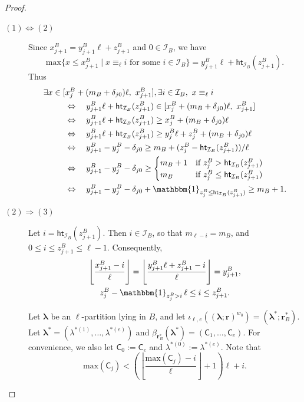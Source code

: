 \documentclass[11pt,a4paper,reqno]{amsart}
\numberwithin{equation}{section}
\theoremstyle{plain}
\theoremstyle{definition}
\theoremstyle{remark}
\numberwithin{equation}{section}
\newcommand{\bbone}{\mathbbm{1}}
\newcommand{\bl}{\boldsymbol{\lambda}}
\newcommand{\br}{\mathbf{r}}
\renewcommand{\max}{\mathrm{max}}
\newcommand{\C}{\mathsf{C}}
\newcommand{\Ht}{\mathsf{ht}}
\newcommand{\II}{\mathcal{I}}
\begin{document}
\begin{proof} \hfill
\begin{description}
\item[$(1) \Leftrightarrow (2)$]
Since $x^B_{j+1} = y^B_{j+1} \ell + z^B_{j+1}$ and $0 \in \II_B$, we have
$$
\max\{ x \leq x^B_{j+1} \mid x \equiv_{\ell} i \text{ for some } i \in \II_B \} = y^B_{j+1} \ell + \Ht_{\II_B}(z^B_{j+1}).
$$
Thus
\begin{align*}
\exists x \in [&x_j^B + (m_B + \delta_{j0})\ell,\ x^B_{j+1} ], \exists i \in \II_B,\ x\equiv_{\ell} i \\
&\Leftrightarrow
\quad y^B_{j+1} \ell + \Ht_{\II_B}(z^B_{j+1}) \in [x_j^B + (m_B + \delta_{j0})\ell,\ x^B_{j+1} ] \\
&\Leftrightarrow
\quad y^B_{j+1} \ell + \Ht_{\II_B}(z^B_{j+1}) \geq x_j^B + (m_B + \delta_{j0})\ell \\
&\Leftrightarrow
\quad y^B_{j+1} \ell + \Ht_{\II_B}(z^B_{j+1}) \geq y_j^B \ell + z^B_j + (m_B + \delta_{j0})\ell \\
&\Leftrightarrow
\quad y^B_{j+1} - y^B_j - \delta_{j0} \geq m_B + (z^B_j -  \Ht_{\II_B}(z^B_{j+1}))/\ell \\
&\Leftrightarrow
\quad y^B_{j+1} - y^B_j - \delta_{j0} \geq
\begin{cases}
m_B + 1 &\text{if } z^B_j >  \Ht_{\II_B}(z^B_{j+1}) \\
m_B &\text{if } z^B_j \leq  \Ht_{\II_B}(z^B_{j+1})
\end{cases} \\
&\Leftrightarrow
\quad y^B_{j+1} - y^B_j - \delta_{j0} + \bbone_{z^B_j \leq  \Ht_{\II_B}(z^B_{j+1})} \geq m_B +1.
\end{align*}

\item[$(2) \Rightarrow (3)$]
Let $i = \Ht_{\II_B}(z^B_{j+1})$.  
Then $i \in \II_B$, so that $m_{\ell-i} = m_B$, and $0 \leq i \leq z^B_{j+1} \leq \ell-1$.  Consequently,
\begin{gather}
  \left\lfloor \frac{x^B_{j+1} - i}{\ell} \right\rfloor = \left\lfloor \frac{y^B_{j+1}\ell + z^B_{j+1} - i}{\ell} \right\rfloor = y^B_{j+1}, \label{E:y^B_{j+1}} \\
  z^B_j - \bbone_{z^B_j > i}\, \ell \leq i \leq z^B_{j+1}.  \label{E:z^B_j}
\end{gather}


Let $\bl$ be an $\ell$-partition lying in $B$, and let $\iota_{\ell,e}((\bl;\br)^{w_0}) = (\bl^*;\br^*_B)$. Let $\bl^* = (\lambda^{*(1)},\dotsc, \lambda^{*(e)})$ and $\beta_{\br^*_B}(\bl^*) = (\C_1,\dotsc, \C_e)$.
For convenience, we also let $\C_0 := \C_e$ and $\lambda^{*(0)} := \lambda^{*(e)}$.
Note that %
\begin{equation} \label{E:max(C_j)}
\max(\C_j) <
\left( \left \lfloor \frac{\max(\C_j) - i}{\ell} \right \rfloor + 1  \right) \ell + i.
\end{equation}


\end{description}
\end{proof}
\end{document}
